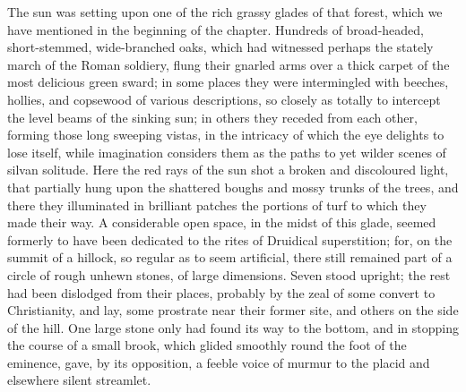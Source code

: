 The sun was setting upon one of the rich grassy glades of that forest,
which we have mentioned in the beginning of the chapter. Hundreds of
broad-headed, short-stemmed, wide-branched oaks, which had witnessed
perhaps the stately march of the Roman soldiery, flung their gnarled
arms over a thick carpet of the most delicious green sward; in some
places they were intermingled with beeches, hollies, and copsewood of
various descriptions, so closely as totally to intercept the level beams
of the sinking sun; in others they receded from each other, forming
those long sweeping vistas, in the intricacy of which the eye delights
to lose itself, while imagination considers them as the paths to yet
wilder scenes of silvan solitude. Here the red rays of the sun shot a
broken and discoloured light, that partially hung upon the shattered
boughs and mossy trunks of the trees, and there they illuminated in
brilliant patches the portions of turf to which they made their way. A
considerable open space, in the midst of this glade, seemed formerly to
have been dedicated to the rites of Druidical superstition; for, on the
summit of a hillock, so regular as to seem artificial, there still
remained part of a circle of rough unhewn stones, of large dimensions.
Seven stood upright; the rest had been dislodged from their places,
probably by the zeal of some convert to Christianity, and lay, some
prostrate near their former site, and others on the side of the hill.
One large stone only had found its way to the bottom, and in stopping
the course of a small brook, which glided smoothly round the foot of the
eminence, gave, by its opposition, a feeble voice of murmur to the
placid and elsewhere silent streamlet.


